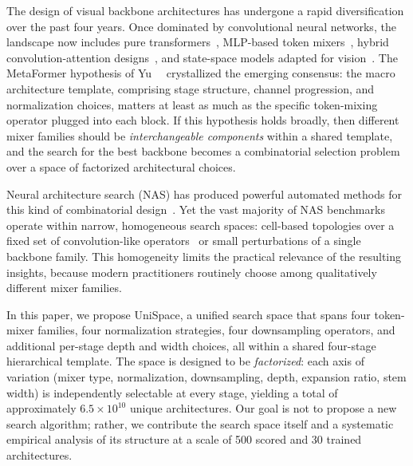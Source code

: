 \documentclass[10pt,twocolumn,letterpaper]{article}
\newcommand{\method}{UniSpace\xspace}
\begin{document}
The design of visual backbone architectures has undergone a rapid diversification over the past four years. Once dominated by convolutional neural networks, the landscape now includes pure transformers~\cite{dosovitskiy2021image,liu2021swin}, MLP-based token mixers~\cite{tolstikhin2021mlpmixer,liu2021gmlp}, hybrid convolution-attention designs~\cite{dai2021coatnet,tu2022maxvit,vasu2023fastvit}, and state-space models adapted for vision~\cite{zhu2024vim,liu2024vmamba}. 
The MetaFormer hypothesis of Yu~\etal~\cite{yu2022metaformer} crystallized the emerging consensus: the macro architecture template, comprising stage structure, channel progression, and normalization choices, matters at least as much as the specific token-mixing operator plugged into each block. 
If this hypothesis holds broadly, then different mixer families should be \emph{interchangeable components} within a shared template, and the search for the best backbone becomes a combinatorial selection problem over a space of factorized architectural choices.

Neural architecture search (NAS) has produced powerful automated methods for this kind of combinatorial design~\cite{liu2019darts,white2023nasinsights}. 
Yet the vast majority of NAS benchmarks operate within narrow, homogeneous search spaces: cell-based topologies over a fixed set of convolution-like operators~\cite{ying2019nasbench101,dong2020nasbench201,zela2022nasbench301} or small perturbations of a single backbone family. 
This homogeneity limits the practical relevance of the resulting insights, because modern practitioners routinely choose among qualitatively different mixer families.

In this paper, we propose \method, a unified search space that spans four token-mixer families, four normalization strategies, four downsampling operators, and additional per-stage depth and width choices, all within a shared four-stage hierarchical template. 
The space is designed to be \emph{factorized}: each axis of variation (mixer type, normalization, downsampling, depth, expansion ratio, stem width) is independently selectable at every stage, yielding a total of approximately $6.5 \times 10^{10}$ unique architectures. 
Our goal is not to propose a new search algorithm; rather, we contribute the search space itself and a systematic empirical analysis of its structure at a scale of 500 scored and 30 trained architectures.
\end{document}
